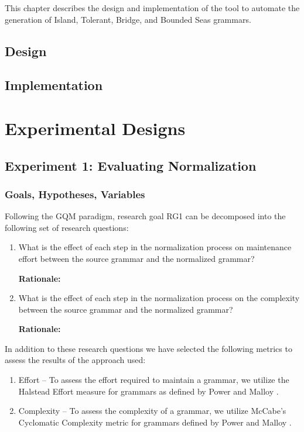 \documentclass[10pt,nocc]{xrese_report}
\begin{document}
This chapter describes the design and implementation of the tool to automate the generation of Island, Tolerant, Bridge, and Bounded Seas grammars.

\section{Design}

\section{Implementation}

\chapter{Experimental Designs}

\section{Experiment 1: Evaluating Normalization}

\subsection{Goals, Hypotheses, Variables}

Following the GQM paradigm, research goal RG1 can be decomposed into the following set of research questions:

\begin{enumerate}[label={\textbf{RQ1.\arabic*}},left=.2in]
 \item What is the effect of each step in the normalization process on maintenance effort between the source grammar and the normalized grammar?
 
 \textbf{Rationale:}\textbf{}
 
 \item What is the effect of each step in the normalization process on the complexity between the source grammar and the normalized grammar?
 
 \textbf{Rationale:}\textbf{}
\end{enumerate}

In addition to these research questions we have selected the following metrics to assess the results of the approach used:

\begin{enumerate}[label={\textbf{M1.\arabic*}},left=.2in]
  \item Effort -- To assess the effort required to maintain a grammar, we utilize the Halstead Effort measure for grammars as defined by Power and Malloy \cite{power_metrics_2004}.
  \item Complexity -- To assess the complexity of a grammar, we utilize McCabe's Cyclomatic Complexity metric for grammars defined by Power and Malloy \cite{power_metrics_2004}.
\end{enumerate}
\end{document}
